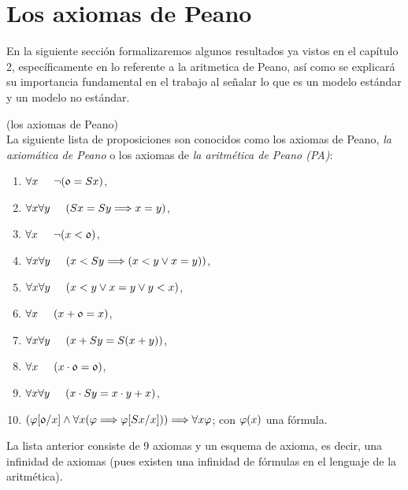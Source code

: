 \section{Los axiomas de Peano}
\label{axiomas_peano}
En la siguiente sección formalizaremos algunos resultados ya vistos en el capítulo 2, específicamente en lo referente a la aritmetica de Peano, así como se explicará su importancia fundamental en el trabajo al señalar lo que es un modelo estándar y un modelo no estándar.

\begin{defn} (los axiomas de Peano)\\
    La siguiente lista de proposiciones son conocidos como {los axiomas de Peano}, \textit{la axiomática de Peano} o los axiomas de \textit{la aritmética de Peano (PA)}:
    \begin{enumerate}
        \item $\forall x\hspace{0.5cm}\neg(\mathfrak{0}=Sx)$,
        \item $\forall x\forall y\hspace{0.5cm}(Sx=Sy\Longrightarrow x=y)$,
        \item $\forall x\hspace{0.5cm}\neg(x<\mathfrak{0})$,
        \item $\forall x\forall y\hspace{0.5cm}(x<Sy\Longrightarrow (x<y\lor x=y))$,
        \item $\forall x\forall y\hspace{0.5cm}(x<y\lor x=y\lor y<x)$,
        \item $\forall x\hspace{0.5cm}(x+\mathfrak{0}=x)$,
        \item $\forall x\forall y\hspace{0.5cm}(x+Sy=S(x+y))$,
        \item $\forall x\hspace{0.5cm}(x\cdot\mathfrak{0}=\mathfrak{0})$,
        \item $\forall x\forall y\hspace{0.5cm}(x\cdot Sy=x\cdot y+x)$,
        \item $(\varphi[\mathfrak{0}/x]\land\forall x(\varphi\Longrightarrow\varphi[Sx/x]))\Longrightarrow\forall x\varphi$; con $\varphi(x)$ una fórmula.
    \end{enumerate}
\end{defn}
\begin{obs}
    La lista anterior consiste de 9 axiomas y un esquema de axioma, es decir, una infinidad de axiomas (pues existen una infinidad de fórmulas en el lenguaje de la aritmética).
\end{obs}
